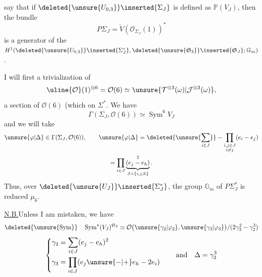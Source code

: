  say that if 
$\deleted{\unsure{U_{0,3}}}\inserted{\Sigma_J}$ is defined as $\mathbb P(V_J)$, 
then the  bundle
\[
P\Sigma_J=\check V(\mathcal O_{\Sigma_J}(1))^{*}
\]
is a generator of the
$H^1(\deleted{\unsure{U_{0,3}}}\inserted{\Sigma_J^*},
\deleted{\unsure{\mathfrak S_3}}\inserted{\mathfrak S_J};\mathbb G_m)$.

I will first  a trivialization of
\[
\uline{\mathcal O}(1)^{\otimes6}=\mathcal O(6)\simeq
\unsure{\mathcal T^{\otimes3}(\omega)|\mathcal J^{\otimes3}(\omega)},
\]
  a section of $\mathcal O(6)$
(which 
 on $\Sigma^*$.
We  have
\[
\Gamma(\Sigma_J,\mathcal O(6))\simeq\operatorname{Sym}^{6}V_J
\]
and we will take
\[
\begin{gathered}
\unsure{\varphi|\Delta}\in\Gamma(\Sigma_J,\mathcal O(6)),\qquad
\unsure{\varphi|\Delta}
=\deleted{\unsure{\sum_{i\in J}}}
-\prod_{\substack{i,j\in J\\i\ne j}}(e_i-e_j)\\
=\prod_{i\in J}\underbrace{(e_j-e_h)}_{J=\{i,j,h\}}^{2}.
\end{gathered}
\]
Thus, over $\deleted{\unsure{U_J}}\inserted{\Sigma_J^{*}}$, the  group
$\mathbb G_m$ of $P\Sigma_J^{*}$ is reduced  $\mu_6$.

\uline{N.B.}\quad Unless I am mistaken, we have
\[
\deleted{\unsure{\operatorname{Sym}}}\quad
\operatorname{Sym}^{*}(V_J)^{\mathfrak S_3}\simeq
\mathcal O\bigl(\unsure{\gamma_2|\varphi_2},\unsure{\gamma_3|\varphi_3}\bigr)
/(2\gamma_3^2-\gamma_2^3)
\]
\[
\left\{\begin{aligned}
\gamma_2&=\sum_{i\in J}(e_j-e_h)^2\\
\gamma_3&=\prod_{i\in J}(e_j\unsure{-|+}e_h-2e_i)
\end{aligned}\right.
\qquad\text{and}\quad\Delta=\gamma_2^3
\]


